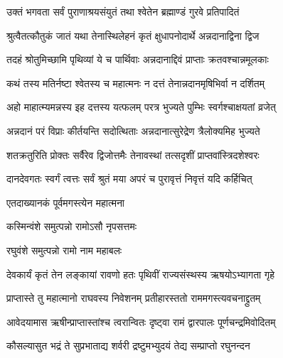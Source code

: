 


\twolineshloka
{उक्तं भगवता सर्वं पुराणाश्रयसंयुतं}
{तथा श्वेतेन ब्रह्माण्डं गुरवे प्रतिपादितं}%

\twolineshloka
{श्रुत्वैतत्कौतुकं जातं यथा तेनास्थिलेहनं}
{कृतं क्षुधापनोदार्थे अन्नदानाद्विना द्विज}%

\twolineshloka
{तदहं श्रोतुमिच्छामि पृथिव्यां ये च पार्थिवाः}
{अन्नदानाद्दिवं प्राप्ताः क्रतवश्चान्नमूलकाः}%

\twolineshloka
{कथं तस्य मतिर्नष्टा श्वेतस्य च महात्मनः}
{न दत्तं तेनान्नदानमृषिभिर्वा न दर्शितम्}%

\twolineshloka
{अहो माहात्म्यमन्नस्य इह दत्तस्य यत्फलम्}
{परत्र भुज्यते पुम्भिः स्वर्गश्चाक्षयतां व्रजेत्}%

\twolineshloka
{अन्नदानं परं विप्राः कीर्तयन्ति सदोत्थिताः}
{अन्नदानात्सुरेद्रेण त्रैलोक्यमिह भुज्यते}%

\twolineshloka
{शतक्रतुरिति प्रोक्तः सर्वैरेव द्विजोत्तमैः}
{तेनावस्थां तत्सदृशीं प्राप्तवांस्त्रिदशेश्वरः}%

\twolineshloka
{दानदेवगतः स्वर्गं त्वत्तः सर्वं श्रुतं मया}
{अपरं च पुरावृत्तं निवृत्तं यदि कर्हिचित्}%



\onelineshloka
{एतदाख्यानकं पूर्वमगस्त्येन महात्मना}%



\onelineshloka
{कस्मिन्वंशे समुत्पन्नो रामोऽसौ नृपसत्तमः}%



\onelineshloka
{रघुवंशे समुत्पन्नो रामो नाम महाबलः}%

\twolineshloka
{देवकार्यं कृतं तेन लङ्कायां रावणो हतः}
{पृथिवीं राज्यसंस्थस्य ऋषयोऽभ्यागता गृहे}%

\twolineshloka
{प्राप्तास्ते तु महात्मानो राघवस्य निवेशनम्}
{प्रतीहारस्ततो राममगस्त्यवचनाद्द्रुतम्}%

\twolineshloka
{आवेदयामास ऋषीन्प्राप्तास्तांश्च त्वरान्वितः}
{दृष्ट्वा रामं द्वारपालः पूर्णचन्द्रमिवोदितम्}%

\twolineshloka
{कौसल्यासुत भद्रं ते सुप्रभाताद्य शर्वरी}
{द्रष्टुमभ्युदयं तेद्य सम्प्राप्तो रघुनन्दन}%

